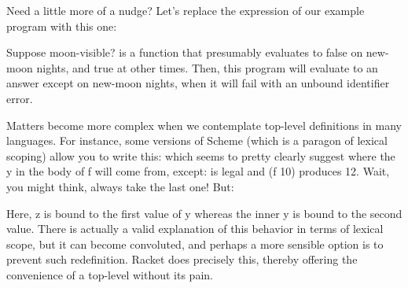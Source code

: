 Need a little more of a nudge? Let’s replace the expression of our example
program with this one:

Suppose moon-visible? is a function that presumably evaluates to false on
new-moon nights, and true at other times. Then, this program will evaluate to an
answer except on new-moon nights, when it will fail with an unbound identifier
error.



Matters become more complex when we contemplate top-level definitions in many
languages. For instance, some versions of Scheme (which is a paragon of lexical scoping) allow you to write this:
which seems to pretty clearly suggest where the y in the body of f will come
from, except:
is legal and (f 10) produces 12. Wait, you might think, always take the last
one! But:

Here, z is bound to the first value of y whereas the inner y is bound to the
second value. There is actually a valid explanation of this behavior in terms of
lexical scope, but it can become convoluted, and perhaps a more sensible option is to
prevent such redefinition. Racket does precisely this, thereby offering the
convenience of a top-level without its pain.

\secup
